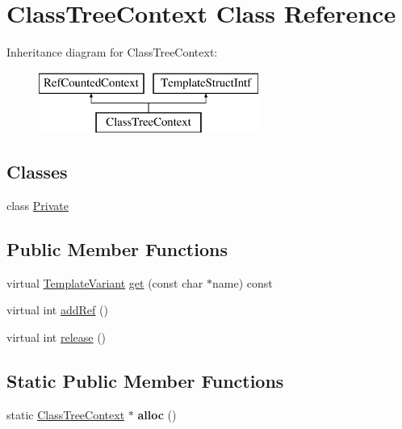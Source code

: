 \hypertarget{class_class_tree_context}{}\section{Class\+Tree\+Context Class Reference}
\label{class_class_tree_context}
Inheritance diagram for Class\+Tree\+Context\+:\begin{figure}[H]
\begin{center}
\leavevmode
\includegraphics[height=2.000000cm]{class_class_tree_context}
\end{center}
\end{figure}
\subsection*{Classes}
\begin{DoxyCompactItemize}
\item 
class \mbox{\hyperlink{class_class_tree_context_1_1_private}{Private}}
\end{DoxyCompactItemize}
\subsection*{Public Member Functions}
\begin{DoxyCompactItemize}
\item 
virtual \mbox{\hyperlink{class_template_variant}{Template\+Variant}} \mbox{\hyperlink{class_class_tree_context_a3358abb53b7dae8ebc132b1e1b581e9f}{get}} (const char $\ast$name) const
\item 
virtual int \mbox{\hyperlink{class_class_tree_context_a309d28268edd019326c83f2d9480ba16}{add\+Ref}} ()
\item 
virtual int \mbox{\hyperlink{class_class_tree_context_a2a946d5d9d5170215eed8d69c5d51fc6}{release}} ()
\end{DoxyCompactItemize}
\subsection*{Static Public Member Functions}
\begin{DoxyCompactItemize}
\item 
\mbox{\label{class_class_tree_context_add688a0dc5bb8b4dc1e9ce700fe57459}} 
static \mbox{\hyperlink{class_class_tree_context}{Class\+Tree\+Context}} $\ast$ {\bfseries alloc} ()
\end{DoxyCompactItemize}



